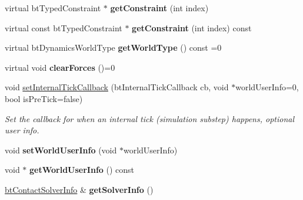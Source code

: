 \begin{DoxyCompactItemize}
\item 
\hypertarget{classbt_dynamics_world_a25547b26ffbe6659c34c7e021bc2e532}{virtual bt\+Typed\+Constraint $\ast$ {\bfseries get\+Constraint} (int index)}\label{classbt_dynamics_world_a25547b26ffbe6659c34c7e021bc2e532}

\item 
\hypertarget{classbt_dynamics_world_a4f4b9c286cf78dd2020f1718526423bc}{virtual const bt\+Typed\+Constraint $\ast$ {\bfseries get\+Constraint} (int index) const }\label{classbt_dynamics_world_a4f4b9c286cf78dd2020f1718526423bc}

\item 
\hypertarget{classbt_dynamics_world_a7c657a2757b38c533dd6b3a7110624e1}{virtual bt\+Dynamics\+World\+Type {\bfseries get\+World\+Type} () const =0}\label{classbt_dynamics_world_a7c657a2757b38c533dd6b3a7110624e1}

\item 
\hypertarget{classbt_dynamics_world_a9a9d474cc43c25095cd32e1c3332152a}{virtual void {\bfseries clear\+Forces} ()=0}\label{classbt_dynamics_world_a9a9d474cc43c25095cd32e1c3332152a}

\item 
\hypertarget{classbt_dynamics_world_a6974c869e196322377e2d8c078db5805}{void \hyperlink{classbt_dynamics_world_a6974c869e196322377e2d8c078db5805}{set\+Internal\+Tick\+Callback} (bt\+Internal\+Tick\+Callback cb, void $\ast$world\+User\+Info=0, bool is\+Pre\+Tick=false)}\label{classbt_dynamics_world_a6974c869e196322377e2d8c078db5805}

\begin{DoxyCompactList}\small\item\em Set the callback for when an internal tick (simulation substep) happens, optional user info. \end{DoxyCompactList}\item 
\hypertarget{classbt_dynamics_world_ad1f3418fce3381a0fbd4419cc701a97d}{void {\bfseries set\+World\+User\+Info} (void $\ast$world\+User\+Info)}\label{classbt_dynamics_world_ad1f3418fce3381a0fbd4419cc701a97d}

\item 
\hypertarget{classbt_dynamics_world_ae13ad087a699a5caeabe283b69c54340}{void $\ast$ {\bfseries get\+World\+User\+Info} () const }\label{classbt_dynamics_world_ae13ad087a699a5caeabe283b69c54340}

\item 
\hypertarget{classbt_dynamics_world_ae8004bb6113c17b9cd1eca5ade1c2aba}{\hyperlink{structbt_contact_solver_info}{bt\+Contact\+Solver\+Info} \& {\bfseries get\+Solver\+Info} ()}\label{classbt_dynamics_world_ae8004bb6113c17b9cd1eca5ade1c2aba}


\end{DoxyCompactItemize}
